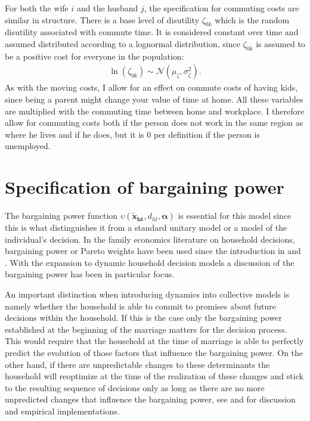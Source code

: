 For both the wife $i$ and the husband $j$, the specification for commuting costs are similar in structure. There is a base level of disutility $\zeta_{0k}$ which is the random disutility associated with commute time. It is considered constant over time and assumed distributed according to a lognormal distribution, since $\zeta_{0k}$ is assumed to be a positive cost for everyone in the population:
\begin{align*}
\ln(\zeta_{0k})\sim \mathcal{N}(\mu_{\zeta},\sigma_{\zeta}^2).
\end{align*}
 As with the moving costs, I allow for an effect on commute costs of having kids, since being a parent might change your value of time at home. All these variables are multiplied with the commuting time between home and workplace. I therefore allow for commuting costs both if the person does not work in the same region as where he lives and if he does, but it is 0 per definition if the person is unemployed. 


\section{Specification of bargaining power}
The bargaining power function $\upsilon(\boldsymbol{\tilde{x}_{ht}},d_{ht},\boldsymbol{\alpha})$ is essential for this model since this is what distinguishes it from a standard unitary model or a model of the individual's decision. In the family economics literature on household decisions, bargaining power or Pareto weights have been used since the introduction in \cite{ManserBrown1980} and \cite{McElroyetal1981}. With the expansion to dynamic household decision models a discussion of the bargaining power has been in particular focus. 

An important distinction when introducing dynamics into collective models is namely whether the household is able to commit to promises about future decisions within the household. If this is the case only the bargaining power established at the beginning of the marriage matters for the decision process. This would require that the household at the time of marriage is able to perfectly predict the evolution of those factors that influence the bargaining power. On the other hand, if there are unpredictable changes to these determinants the household will reoptimize at the time of the realization of these changes and stick to the resulting sequence of decisions only as long as there are no more unpredicted changes that influence the bargaining power, see \cite{LundbergPollak2003,Ligon2011,Theloudis2016} and \cite{Mazzocco2007} for discussion and empirical implementations. 

